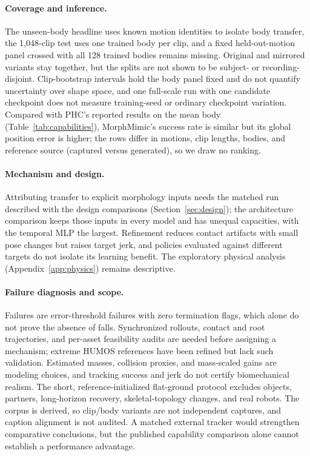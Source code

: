 \paragraph{Coverage and inference.}
The unseen-body headline uses known motion identities to isolate body transfer,
the 1,048-clip test uses one trained body per clip, and a fixed held-out-motion
panel crossed with all 128 trained bodies remains missing. Original and mirrored
variants stay together, but the splits are not shown to be subject- or
recording-disjoint. Clip-bootstrap intervals hold the body panel fixed and do not
quantify uncertainty over shape space, and one full-scale run with one candidate
checkpoint does not measure training-seed or ordinary checkpoint variation.
Compared with PHC's reported results on the mean body
(Table~\ref{tab:capabilities}), MorphMimic's success rate is similar but its
global position error is higher; the rows differ in motions, clip lengths, bodies,
and reference source (captured versus generated), so we draw no ranking.

\paragraph{Mechanism and design.}
Attributing transfer to explicit morphology inputs needs the matched run
described with the design comparisons (Section~\ref{sec:design}); the architecture comparison keeps those
inputs in every model and has unequal capacities, with the temporal MLP the
largest. Refinement reduces contact artifacts with small pose changes but raises
target jerk, and policies evaluated against different targets do not isolate its
learning benefit. The exploratory physical analysis
(Appendix~\ref{app:physics}) remains descriptive.

\paragraph{Failure diagnosis and scope.}
Failures are error-threshold failures with zero termination flags, which alone
do not prove the absence of falls. Synchronized rollouts, contact and root
trajectories, and per-asset feasibility audits are needed before assigning a
mechanism; extreme HUMOS references have been refined but lack such validation.
Estimated masses, collision proxies, and mass-scaled gains are modeling choices,
and tracking success and jerk do not certify biomechanical realism. The short,
reference-initialized flat-ground protocol excludes objects, partners,
long-horizon recovery, skeletal-topology changes, and real robots. The corpus is
derived, so clip/body variants are not independent captures, and caption
alignment is not audited. A matched external tracker would strengthen
comparative conclusions, but the published capability comparison alone cannot
establish a performance advantage.

